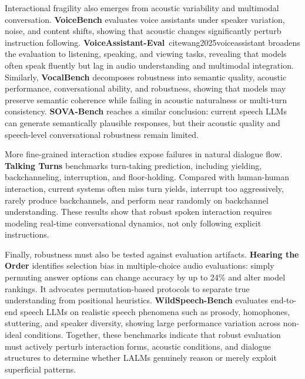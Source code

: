 \documentclass{llmxive}
\begin{document}
Interactional fragility also emerges from acoustic variability and multimodal conversation. \textbf{VoiceBench} \cite{chen2026voicebench} evaluates voice assistants under speaker variation, noise, and content shifts, showing that acoustic changes significantly perturb instruction following. \textbf{VoiceAssistant-Eval}\ cite{wang2025voiceassistant} broadens the evaluation to listening, speaking, and viewing tasks, revealing that models often speak fluently but lag in audio understanding and multimodal integration. Similarly, \textbf{VocalBench} \cite{liu2025vocalbench} decomposes robustness into semantic quality, acoustic performance, conversational ability, and robustness, showing that models may preserve semantic coherence while failing in acoustic naturalness or multi-turn consistency. \textbf{SOVA-Bench} \cite{hou2025sova} reaches a similar conclusion: current speech LLMs can generate semantically plausible responses, but their acoustic quality and speech-level conversational robustness remain limited.

More fine-grained interaction studies expose failures in natural dialogue flow. \textbf{Talking Turns} \cite{arora2025talking} benchmarks turn-taking prediction, including yielding, backchanneling, interruption, and floor-holding. Compared with human-human interaction, current systems often miss turn yields, interrupt too aggressively, rarely produce backchannels, and perform near randomly on backchannel understanding. These results show that robust spoken interaction requires modeling real-time conversational dynamics, not only following explicit instructions.

Finally, robustness must also be tested against evaluation artifacts. \textbf{Hearing the Order} \cite{lin2025hearing} identifies selection bias in multiple-choice audio evaluations: simply permuting answer options can change accuracy by up to 24\% and alter model rankings. It advocates permutation-based protocols to separate true understanding from positional heuristics. \textbf{WildSpeech-Bench} \cite{zhang2025wildspeechbench} evaluates end-to-end speech LLMs on realistic speech phenomena such as prosody, homophones, stuttering, and speaker diversity, showing large performance variation across non-ideal conditions. Together, these benchmarks indicate that robust evaluation must actively perturb interaction forms, acoustic conditions, and dialogue structures to determine whether LALMs genuinely reason or merely exploit superficial patterns.

\end{document}
